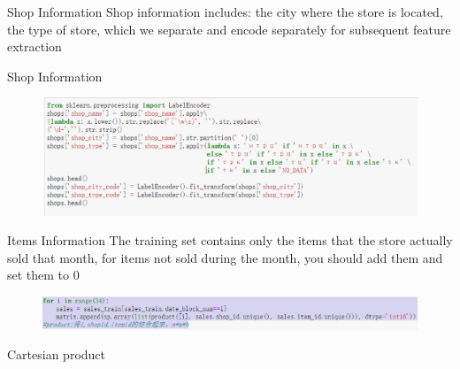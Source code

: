 \documentclass[
 size=14pt,
 paper=smartboard,  %
 mode=present, 		%
 display=slides, 	%
 style=tuliplab,  	%
 pauseslide,
 fleqn,leqno]{powerdot}
\begin{document}
\begin{slide}[toc=,bm=]{Shop Information}
  Shop information includes: the city where the store is located, the type of store, which we separate and encode separately for subsequent feature extraction
\end{slide}





\begin{slide}[toc=,bm=]{Shop Information}
  \begin{figure}
    \includegraphics[scale=0.5]{picture/data_12.eps}
  \end{figure}
\end{slide}


\begin{slide}[toc=,bm=]{Items Information}
  The training set contains only the items that the store actually sold that month,
  for items not sold during the month, you should add them and set them to 0
  \begin{figure}
    \includegraphics[scale=0.5]{picture/data_15.eps}
  \end{figure}
   Cartesian product
\end{slide}
\end{document}

